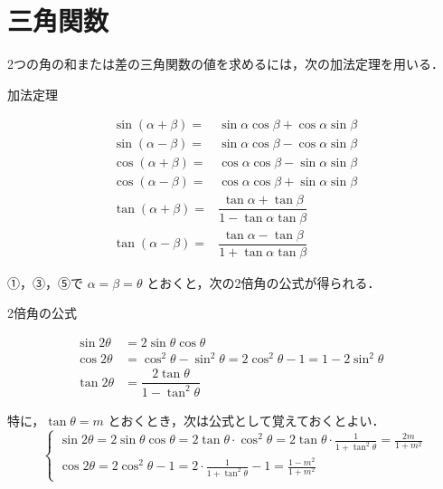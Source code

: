 \section{三角関数}
2つの角の和または差の三角関数の値を求めるには，次の加法定理を用いる．
\begin{titlebox}{加法定理}
\begin{fleqn}[4zw]
\begin{align*}
\sin(\alpha + \beta)=&\sin\alpha\cos\beta + \cos\alpha\sin\beta\tag*{……①}\\
\sin(\alpha - \beta)=&\sin\alpha\cos\beta - \cos\alpha\sin\beta\tag*{……②}\\
\cos(\alpha + \beta)=&\cos\alpha\cos\beta - \sin\alpha\sin\beta\tag*{……③}\\
\cos(\alpha - \beta)=&\cos\alpha\cos\beta + \sin\alpha\sin\beta\tag*{……④}\\
\tan(\alpha + \beta)=&\dfrac{\tan\alpha + \tan\beta}{1 - \tan\alpha\tan\beta}\tag*{……⑤}\\[3mm]
\tan(\alpha - \beta)=&\dfrac{\tan\alpha - \tan\beta}{1 + \tan\alpha\tan\beta}\tag*{……⑥}
\end{align*}
\end{fleqn}
\end{titlebox}

①，③，⑤で $\alpha=\beta=\theta$ とおくと，次の2倍角の公式が得られる．


\begin{titlebox}{2倍角の公式}
\begin{fleqn}[4zw]
\[
\begin{array}{llr}
\sin 2\theta&= 2\sin\theta\cos\theta&\\[1mm]
\cos 2\theta&= \cos^2\theta - \sin^2\theta = 2\cos^2\theta - 1 
= 1-2\sin^2\theta\\
\tan2\theta&= \dfrac{2\tan\theta}{1-\tan^2\theta}&
\end{array}\tag*{……⑦}
\]
\end{fleqn}
\end{titlebox}

特に，$\tan\theta=m$ とおくとき，次は公式として覚えておくとよい．
$$
\left\{\begin{array}{l}
\sin 2\theta=2\sin\theta\cos\theta=2\tan\theta\cdot\cos^{2}\theta=2\tan\theta\cdot\frac{1}{1+\tan^{2}\theta}=\frac{2m}{1+m^{2}}\\[3mm]
\cos 2\theta=2\cos^2\theta-1=2\cdot\frac{1}{1+\tan^{2}\theta}-1=\frac{1-m^{2}}{1+m^{2}}
\end{array}\right.
$$

